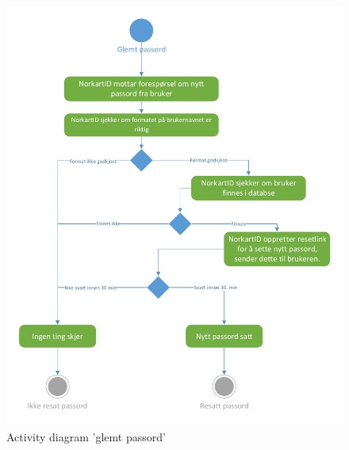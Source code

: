 \begin{figure}[H]
\centering
    \includegraphics[scale=0.65]{graphics/04-arkitektur/ProsessViewGlemtPassord}
    \caption{Activity diagram 'glemt passord' }
    \label{fig:ProsessViewGlemtPassord}
\end{figure}


